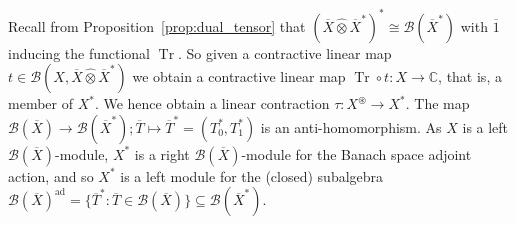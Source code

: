 \documentclass[a4paper,11pt]{article}
\theoremstyle{plain}
\theoremstyle{remark}
\newcommand{\mc}[1]{\mathcal{#1}}
\newcommand{\proten}{\widehat\otimes}
\newcommand{\intdual}{\circledast}
\newcommand{\tr}{\operatorname{Tr}}
\newcommand{\ad}{{\operatorname{ad}}}
\begin{document}
Recall from Proposition~\ref{prop:dual_tensor} that $(\overline X \proten \overline X^*)^* \cong \mc B(\overline X^*)$ with $\overline 1$ inducing the functional $\tr$.  So given a contractive linear map $t\in\mc B(X, \overline X \proten \overline X^*)$ we obtain a contractive linear map $\tr\circ t \colon X \to \mathbb C$, that is, a member of $X^*$.
We hence obtain a linear contraction $\tau \colon X^\intdual \to X^*$.  The map $\mc B(\overline X) \to \mc B(\overline X^*); \overline T\mapsto \overline T^*=(T_0^*, T_1^*)$ is an anti-homomorphism.  As $X$ is a left $\mc B(\overline X)$-module, $X^*$ is a right $\mc B(\overline X)$-module for the Banach space adjoint action, and so $X^*$ is a left module for the (closed) subalgebra $\mc B(\overline X)^\ad = \{ \overline T^* : \overline T \in \mc B(\overline X) \} \subseteq \mc B(\overline X^*)$.  %
\end{document}
